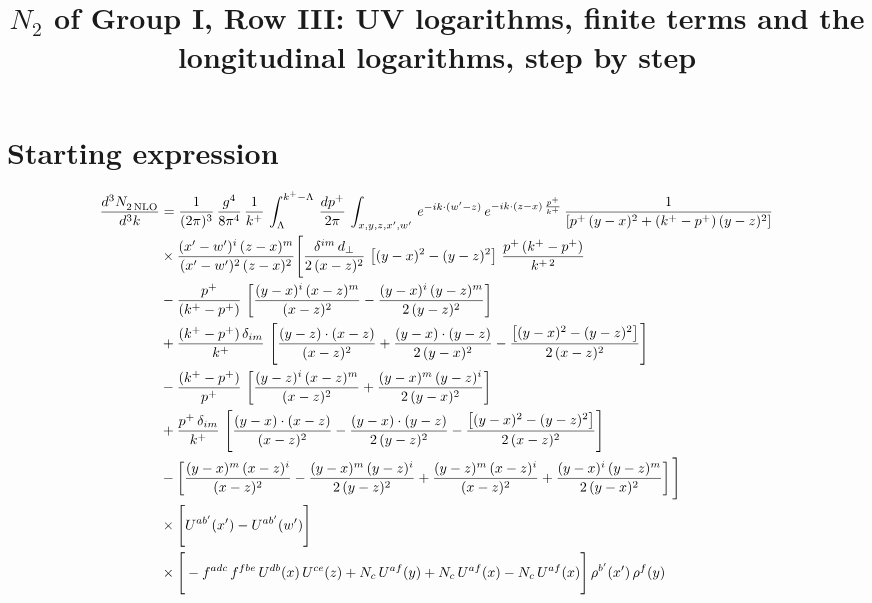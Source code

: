 \documentclass[10pt]{article}
\title{$N_{2}$ of Group I, Row III: UV logarithms, finite terms and the longitudinal logarithms, step by step}
\date{}
\numberwithin{equation}{section}
\begin{document}
\maketitle

\section{Starting expression}
\begin{align}
    \frac{d^{3}N_{2\,\rm NLO}^{\rm}}{d^{3}k}  & =  \frac{1}{(2\pi)^{3}}\, \frac{g^{4}}{8\pi^{4}}\,\frac{1}{k^{+}}\,\int_{\Lambda}^{k^{+}-\Lambda}\, \frac{dp^{+}}{2\pi} \, \int_{x,y,z,x',w'}\,e^{-ik\cdot(w'-z)}\,e^{-ik\cdot (z-x)\,\frac{p^{+}}{k^{+}}}\,\frac{1}{\left[p^{+}\,(y-x)^{2}+(k^{+}-p^{+})\,(y-z)^{2}\right]} \notag \\ & \times\frac{(x'-w')^{i}\,(z-x)^{m}}{(x'-w')^{2}\,(z-x)^{2}}\Bigg[\frac{\delta^{im}\,d_{\perp}}{2\,(x-z)^{2}}\,\left[(y-x)^{2}-(y-z)^{2}\right]\,\frac{p^{+}\,(k^{+}-p^{+})}{k^{+\,2}}\notag\\ &-\frac{p^{+}}{(k^{+}-p^{+})}\,\left[\frac{(y-x)^{i}\,(x-z)^{m}}{(x-z)^{2}}-\frac{(y-x)^{i}\,(y-z)^{m}}{2\,(y-z)^{2}}\right]\notag \\ & +\frac{(k^{+}-p^{+})\,\delta_{im}}{k^{+}}\,\left[\frac{(y-z)\cdot (x-z)}{(x-z)^{2}}+\frac{(y-x)\cdot (y-z)}{2\,(y-x)^{2}}-\frac{\left[(y-x)^{2}-(y-z)^{2}\right]}{2\,(x-z)^{2}}\right]\notag \\ & -\frac{(k^{+}-p^{+})}{p^{+}}\,\left[\frac{(y-z)^{i}\,(x-z)^{m}}{(x-z)^{2}}+\frac{(y-x)^{m}\,(y-z)^{i}}{2\,(y-x)^{2}}\right]\notag \\ & +\frac{p^{+}\,\delta_{im}}{k^{+}}\,\left[\frac{(y-x)\cdot (x-z)}{(x-z)^{2}}-\frac{(y-x)\cdot (y-z)}{2\,(y-z)^{2}}-\frac{\left[(y-x)^{2}-(y-z)^{2}\right]}{2\,(x-z)^{2}}\right]\notag \\ &-\left[\frac{(y-x)^{m}\,(x-z)^{i}}{(x-z)^{2}}-\frac{(y-x)^{m}\,(y-z)^{i}}{2\,(y-z)^{2}}+\frac{(y-z)^{m}\,(x-z)^{i}}{(x-z)^{2}}+\frac{(y-x)^{i}\,(y-z)^{m}}{2\,(y-x)^{2}}\right]\Bigg]\notag \\ & \times\Bigg[U^{ab'}(x')-U^{ab'}(w')\Bigg]\notag\\ &\times\Bigg[-f^{adc}\,f^{fbe}\,U^{db}(x)\,U^{ce}(z)+N_{c}\,U^{af}(y)+N_{c}\,U^{af}(x) -N_{c}\,U^{af}(x)\Bigg]\,\rho^{b'}(x')\,\rho^{f}(y)
\label{eq:N2}
\end{align}
\end{document}
